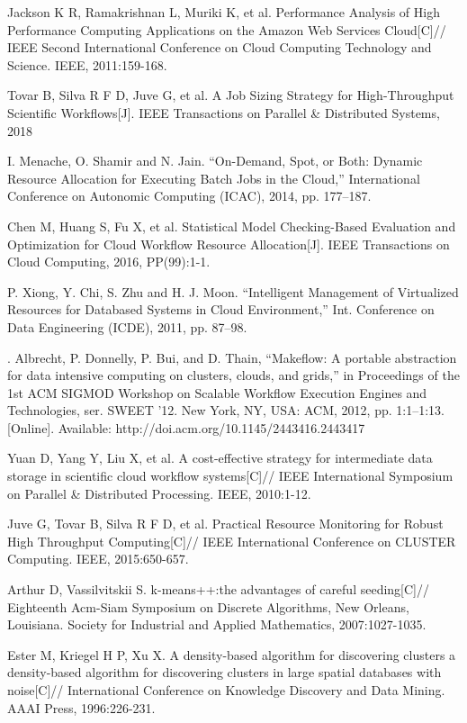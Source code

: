 \documentclass[conference]{IEEEtran}
\begin{document}
\begin{thebibliography}{99}

 Jackson K R, Ramakrishnan L, Muriki K, et al. Performance Analysis of High Performance Computing Applications on the Amazon Web Services Cloud[C]// IEEE Second International Conference on Cloud Computing Technology and Science. IEEE, 2011:159-168.

 Tovar B, Silva R F D, Juve G, et al. A Job Sizing Strategy for High-Throughput Scientific Workflows[J]. IEEE Transactions on Parallel \& Distributed Systems, 2018

 I. Menache, O. Shamir and N. Jain. “On-Demand, Spot, or Both: Dynamic Resource Allocation for Executing Batch Jobs in the Cloud,” International Conference on Autonomic Computing (ICAC), 2014, pp. 177–187.

 Chen M, Huang S, Fu X, et al. Statistical Model Checking-Based Evaluation and Optimization for Cloud Workflow Resource Allocation[J]. IEEE Transactions on Cloud Computing, 2016, PP(99):1-1.

 P. Xiong, Y. Chi, S. Zhu and H. J. Moon. “Intelligent Management of Virtualized Resources for Databased Systems in Cloud Environment,” Int. Conference on Data Engineering (ICDE), 2011, pp. 87–98.

. Albrecht, P. Donnelly, P. Bui, and D. Thain, “Makeflow: A portable abstraction for data intensive computing on clusters, clouds, and grids,” in Proceedings of the 1st ACM SIGMOD Workshop on Scalable Workflow Execution Engines and Technologies, ser. SWEET ’12. New York, NY, USA: ACM, 2012, pp. 1:1–1:13. [Online]. Available: http://doi.acm.org/10.1145/2443416.2443417

 Yuan D, Yang Y, Liu X, et al. A cost-effective strategy for intermediate data storage in scientific cloud workflow systems[C]// IEEE International Symposium on Parallel \& Distributed Processing. IEEE, 2010:1-12.

 Juve G, Tovar B, Silva R F D, et al. Practical Resource Monitoring for Robust High Throughput Computing[C]// IEEE International Conference on CLUSTER Computing. IEEE, 2015:650-657.

 Arthur D, Vassilvitskii S. k-means++:the advantages of careful seeding[C]// Eighteenth Acm-Siam Symposium on Discrete Algorithms, New Orleans, Louisiana. Society for Industrial and Applied Mathematics, 2007:1027-1035.

 Ester M, Kriegel H P, Xu X. A density-based algorithm for discovering clusters a density-based algorithm for discovering clusters in large spatial databases with noise[C]// International Conference on Knowledge Discovery and Data Mining. AAAI Press, 1996:226-231.


\end{thebibliography}
\end{document}
